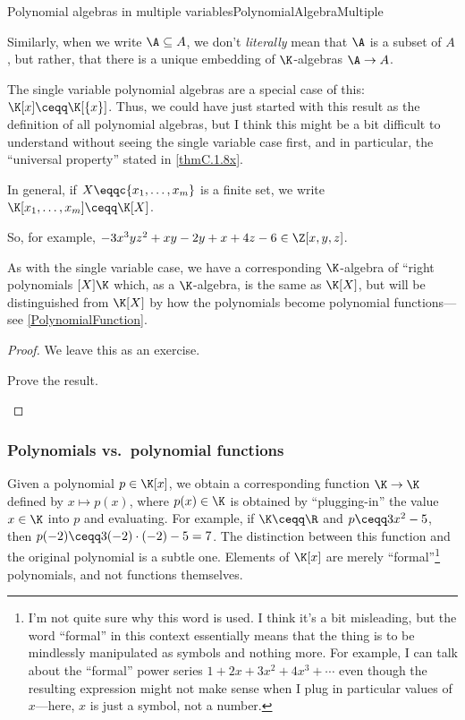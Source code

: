 \begin{thm}{Polynomial algebras in multiple variables}{PolynomialAlgebraMultiple}
\begin{rmk}
		Similarly, when we write $\A \subseteq A$, we don't \emph{literally} mean that $\A$ is a subset of $A$, but rather, that there is a unique embedding of $\K$-algebras $\A \rightarrow A$.
	\end{rmk}
	\begin{rmk}
		The single variable polynomial algebras are a special case of this:  $\K [x]\ceqq \K [\{ x\} ]$.  Thus, we could have just started with this result as the definition of all polynomial algebras, but I think this might be a bit difficult to understand without seeing the single variable case first, and in particular, the ``universal property'' stated in \cref{thmC.1.8x}.
	\end{rmk}
	\begin{rmk}
		In general, if $X\eqqc \{ x_1,\ldots ,x_m\}$ is a finite set, we write $\K [x_1,\ldots ,x_m]\ceqq \K [X]$\index[notation]{$\K [x_1,\ldots ,x_m]$}.
	\end{rmk}
	\begin{rmk}
		So, for example, $-3x^3yz^2+xy-2y+x+4z-6\in \Z [x,y,z]$.
	\end{rmk}
	\begin{rmk}
		As with the single variable case, we have a corresponding $\K$-algebra of ``right polynomials $[X]\K$ which, as a $\K$-algebra, is the same as $\K [X]$, but will be distinguished from $\K [X]$ by how the polynomials become polynomial functions---see \cref{PolynomialFunction}.
	\end{rmk}
	\begin{proof}
		We leave this as an exercise.
		\begin{exr}[breakable=false]{}{}
			Prove the result.
		\end{exr}
	\end{proof}
\end{thm}

\subsubsection{Polynomials vs.~polynomial functions}\label{sss1.1.1}

Given a polynomial $p\in \K [x]$, we obtain a corresponding function $\K \rightarrow \K$ defined by $x\mapsto p(x)$, where $p(x)\in \K$ is obtained by ``plugging-in'' the value $x\in \K$ into $p$ and evaluating.  For example, if $\K \ceqq \R$ and $p\ceqq 3x^2-5$, then $p(-2)\ceqq 3(-2)\cdot (-2)-5=7$.  The distinction between this function and the original polynomial is a subtle one.  Elements of $\K [x]$ are merely ``formal''\footnote{I'm not quite sure why this word is used.  I think it's a bit misleading, but the word ``formal'' in this context essentially means that the thing is to be mindlessly manipulated as symbols and nothing more.  For example, I can talk about the ``formal'' power series $1+2x+3x^2+4x^3+\cdots$ even though the resulting expression might not make sense when I plug in particular values of $x$---here, $x$ is just a symbol, not a number.} polynomials, and not functions themselves.

